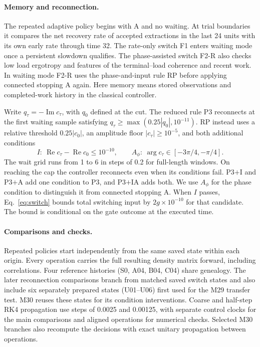 \documentclass[11pt,a4paper]{article}
\newcommand{\pp}[1]{\text{P3#1}}
\begin{document}
\paragraph{Memory and reconnection.}
The repeated adaptive policy begins with A and no waiting. At trial boundaries it compares the net recovery rate of accepted extractions in the last 24 units with its own early rate through time 32. The rate-only switch F1 enters waiting mode once a persistent slowdown qualifies. The phase-assisted switch F2-R also checks low load ergotropy and features of the terminal--load coherence and recent work. In waiting mode F2-R uses the phase-and-input rule RP before applying connected stopping A again. Here memory means stored observations and completed-work history in the classical controller.

Write $q_\tau=-\operatorname{Im}c_\tau$, with $q_0$ defined at the cut. The reduced rule P3 reconnects at the first waiting sample satisfying $q_\tau\ge\max(0.25|q_0|,10^{-11})$. RP instead uses a relative threshold $0.25|c_0|$, an amplitude floor $|c_\tau|\ge10^{-5}$, and both additional conditions
\begin{equation}
 I:\ \operatorname{Re}c_\tau-\operatorname{Re}c_0\le10^{-10},
 \qquad A_\phi:\ \arg c_\tau\in[-3\pi/4,-\pi/4].
 \label{eq:gates}
\end{equation}
The wait grid runs from 1 to 6 in steps of 0.2 for full-length windows. On reaching the cap the controller reconnects even when its conditions fail. $\pp{+I}$ and $\pp{+A}$ add one condition to P3, and $\pp{+IA}$ adds both. We use $A_\phi$ for the phase condition to distinguish it from connected stopping A. When $I$ passes, Eq.~\eqref{eq:switch} bounds total switching input by $2g\times10^{-10}$ for that candidate. The bound is conditional on the gate outcome at the executed time.

\paragraph{Comparisons and checks.}
Repeated policies start independently from the same saved state within each origin. Every operation carries the full resulting density matrix forward, including correlations. Four reference histories (S0, A04, B04, C04) share genealogy. The later reconnection comparisons branch from matched saved switch states and also include six separately prepared states (U01--U06) first used for the M29 transfer test. M30 reuses these states for its condition interventions. Coarse and half-step RK4 propagation use steps of 0.0025 and 0.00125, with separate control clocks for the main comparisons and aligned operations for numerical checks. Selected M30 branches also recompute the decisions with exact unitary propagation between operations.
\end{document}
